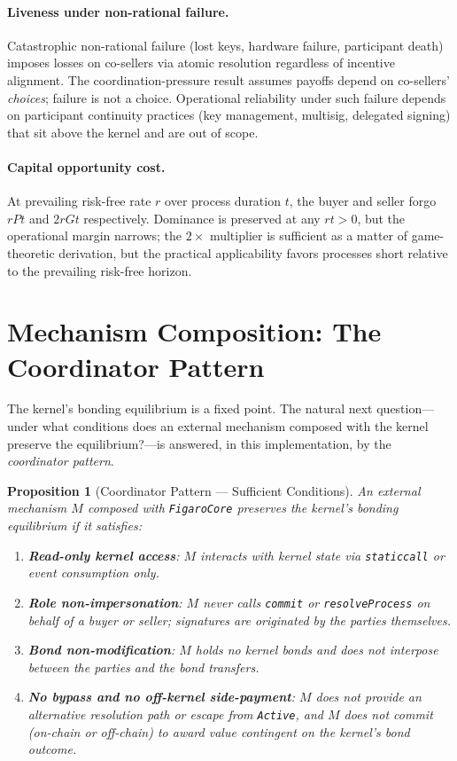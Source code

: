 \documentclass[11pt,a4paper]{article}
\newtheorem{proposition}[theorem]{Proposition}
\theoremstyle{definition}
\theoremstyle{remark}
\newcommand{\pay}{P}
\newcommand{\cumval}{G}
\begin{document}
\paragraph{Liveness under non-rational failure.}
Catastrophic non-rational failure (lost keys, hardware failure,
participant death) imposes losses on co-sellers via atomic
resolution regardless of incentive alignment. The
coordination-pressure result assumes payoffs depend on co-sellers'
\emph{choices}; failure is not a choice. Operational reliability
under such failure depends on participant continuity practices (key
management, multisig, delegated signing) that sit above the kernel
and are out of scope.

\paragraph{Capital opportunity cost.}
At prevailing risk-free rate $r$ over process duration $t$, the
buyer and seller forgo $r\pay t$ and $2r\cumval t$ respectively.
Dominance is preserved at any $rt > 0$, but the operational margin
narrows; the $2\times$ multiplier is sufficient as a matter of
game-theoretic derivation, but the practical applicability favors
processes short relative to the prevailing risk-free horizon.

\section{Mechanism Composition: The Coordinator Pattern}
\label{sec:composition}

The kernel's bonding equilibrium is a fixed point. The natural next
question---under what conditions does an external mechanism composed
with the kernel preserve the equilibrium?---is answered, in this
implementation, by the \emph{coordinator pattern}.

\begin{proposition}[Coordinator Pattern --- Sufficient Conditions]
\label{prop:coordinator}
An external mechanism $M$ composed with \texttt{FigaroCore} preserves
the kernel's bonding equilibrium if it satisfies:
\begin{enumerate}[label=(\roman*)]
  \item \textbf{Read-only kernel access}: $M$ interacts with kernel
    state via \texttt{staticcall} or event consumption only.
  \item \textbf{Role non-impersonation}: $M$ never calls
    \texttt{commit} or \texttt{resolveProcess} on behalf of a buyer
    or seller; signatures are originated by the parties themselves.
  \item \textbf{Bond non-modification}: $M$ holds no kernel bonds
    and does not interpose between the parties and the bond
    transfers.
  \item \textbf{No bypass and no off-kernel side-payment}: $M$ does
    not provide an alternative resolution path or escape from
    \texttt{Active}, and $M$ does not commit (on-chain or off-chain)
    to award value contingent on the kernel's bond outcome.
\end{enumerate}
\end{proposition}
\end{document}
